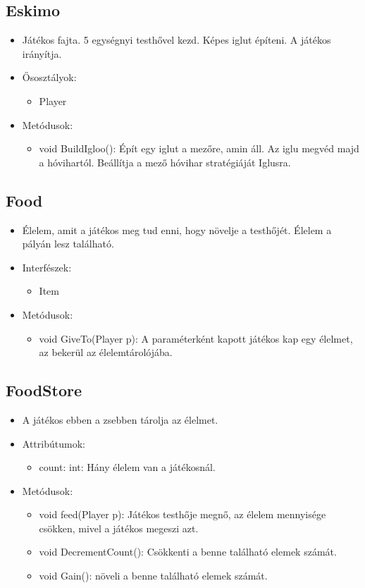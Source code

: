 \subsection{Eskimo}
\begin{itemize}
	\item Játékos fajta. 5 egységnyi testhővel kezd. Képes iglut építeni. A játékos irányítja.
	\item Ősosztályok:
	\begin{itemize}
		\item Player
	\end{itemize}
	\item Metódusok:
	\begin{itemize}
	\item void BuildIgloo(): Épít egy iglut a mezőre, amin áll. Az iglu megvéd majd a hóvihartól. Beállítja a mező hóvihar stratégiáját Iglusra.
	\end{itemize}
\end{itemize}

\subsection{Food}
\begin{itemize}
	\item Élelem, amit a játékos meg tud enni, hogy növelje a testhőjét. Élelem a pályán lesz található.
	\item Interfészek:
	\begin{itemize}
		\item Item
	\end{itemize}
	\item Metódusok:
	\begin{itemize}
		\item void GiveTo(Player p): A paraméterként kapott játékos kap egy élelmet, az bekerül az élelemtárolójába.
	\end{itemize}
\end{itemize}

\subsection{FoodStore}
\begin{itemize}
	\item A játékos ebben a zsebben tárolja az élelmet.
	\item Attribútumok:
	\begin{itemize}
		\item count: int: Hány élelem van a játékosnál.
	\end{itemize}
	\item Metódusok:
	\begin{itemize}
		\item void feed(Player p): Játékos testhője megnő, az élelem mennyisége csökken, mivel a játékos megeszi azt.
		\item void DecrementCount(): Csökkenti a benne található elemek számát.
		\item void Gain(): növeli a benne található elemek számát.
	\end{itemize}
\end{itemize}

